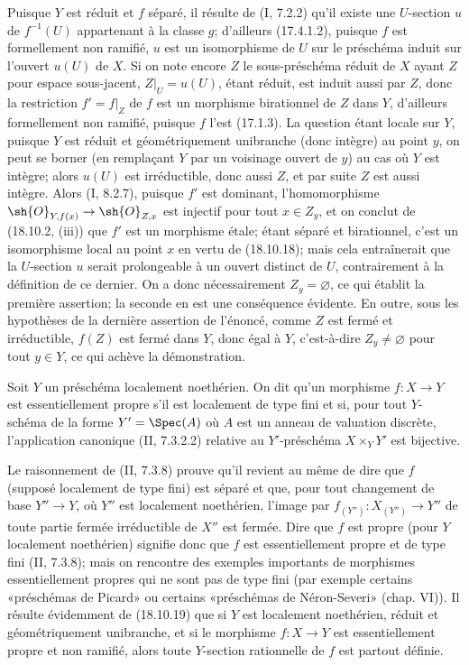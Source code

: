 Puisque $Y$ est réduit et $f$ séparé, il résulte de (I, 7.2.2) qu'il existe une $U$-section $u$ de $f^{-1}(U)$ appartenant à la classe $g$; d'ailleurs (17.4.1.2), puisque $f$ est formellement non ramifié, $u$ est un isomorphisme de $U$ sur le préschéma induit sur l'ouvert $u(U)$ de $X$. Si on note encore $Z$ le sous-préschéma réduit de $X$ ayant $Z$ pour espace sous-jacent, $Z|_U=u(U)$, étant réduit, est induit aussi par $Z$, donc la restriction $f'=f|_Z$ de $f$ est un morphisme birationnel de $Z$ dans $Y$, d'ailleurs formellement non ramifié, puisque $f$ l'est (17.1.3). La question étant locale sur $Y$, puisque $Y$ est réduit et géométriquement unibranche (donc intègre) au point $y$, on peut se borner (en remplaçant $Y$ par un voisinage ouvert de $y$) au cas où $Y$ est intègre; alors $u(U)$ est irréductible, donc aussi $Z$, et par suite $Z$ est aussi intègre. Alors (I, 8.2.7), puisque $f'$ est dominant, l'homomorphisme $\sh{O}_{Y,f(x)}\to\sh{O}_{Z,x}$ est injectif pour tout $x\in Z_y$, et on conclut de (18.10.2, (iii)) que $f'$ est un morphisme étale; étant séparé et birationnel, c'est un isomorphisme local au point $x$ en vertu de (18.10.18); mais cela entraînerait que la $U$-section $u$ serait prolongeable à un ouvert distinct de $U$, contrairement à la définition de ce dernier. On a donc nécessairement $Z_y=\varnothing$, ce qui établit la première assertion; la seconde en est une conséquence évidente. En outre, sous les hypothèses de la dernière assertion de l'énoncé, comme $Z$ est fermé et irréductible, $f(Z)$ est fermé dans $Y$, donc égal à $Y$, c'est-à-dire $Z_y\ne\varnothing$ pour tout $y\in Y$, ce qui achève la démonstration.

\begin{remark}[18.10.20]
\label{IV.18.10.20}
Soit $Y$ un préschéma localement noethérien. On dit qu'un morphisme $f:X\to Y$ est essentiellement propre s'il est localement de type fini et si, pour tout $Y$-schéma de la forme $Y'=\Spec(A)$ où $A$ est un anneau de valuation discrète, l'application canonique (II, 7.3.2.2) relative au $Y'$-préschéma $X\times_Y Y'$ est bijective.


Le raisonnement de (II, 7.3.8) prouve qu'il revient au même de dire que $f$ (supposé localement de type fini) est séparé et que, pour tout changement de base $Y''\to Y$, où $Y''$ est localement noethérien, l'image par $f_{(Y'')}:X_{(Y'')}\to Y''$ de toute partie fermée irréductible de $X''$ est fermée. Dire que $f$ est propre (pour $Y$ localement noethérien) signifie donc que $f$ est essentiellement propre et de type fini (II, 7.3.8); mais on rencontre des exemples importants de morphismes essentiellement propres qui ne sont pas de type fini (par exemple certains «préschémas de Picard» ou certains «préschémas de Néron-Severi» (chap. VI)). Il résulte évidemment de (18.10.19) que si $Y$ est localement noethérien, réduit et géométriquement unibranche, et si le morphisme $f:X\to Y$ est essentiellement propre et non ramifié, alors toute $Y$-section rationnelle de $f$ est partout définie.
\end{remark}

